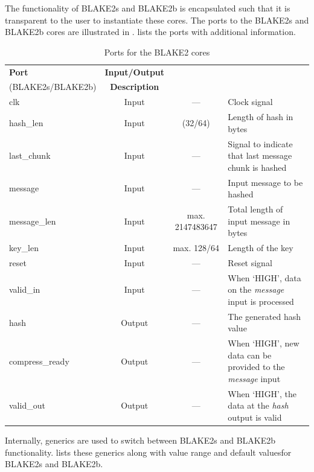 \documentclass[%
	a4paper,
]
{article}
\begin{document}
The functionality of BLAKE2s and BLAKE2b is encapsulated such that it is
transparent to the user to instantiate these cores. The ports to the
BLAKE2s and BLAKE2b cores are illustrated in .
 lists the ports with additional information.

\begin{table}[htp]

	\centering
	\caption{Ports for the BLAKE2 cores}	
	\label{tbl:blake2-ports}
	\renewcommand{\arraystretch}{2}
	\begin{tabular}{l|c|c|m{3cm}}


	\hline
	\textbf{Port}
	& \textbf{Input/Output}
	&	\begin{minipage}[c]{3cm}%
				\textbf{Default value} \\
				(BLAKE2s/BLAKE2b)%
			\end{minipage}%
	& \textbf{Description}
	\\\hline

	clk
	& Input
	& ---
	& Clock signal
	\\\hline

	hash_len
	& Input
	& (32/64)
	&	Length of hash in bytes
	\\\hline

	last_chunk
	& Input
	& ---
	&	Signal to indicate that last message chunk is hashed%
	\\\hline

	message
	& Input
	& ---
	&	Input message to be hashed
	\\\hline

	message_len
	& Input
	& max. 2147483647
	& Total length of input message in bytes
	\\\hline

	key_len
	& Input
	& max. 128/64
	& Length of the key
	\\\hline

	reset
	& Input
	& ---
	& Reset signal
	\\\hline

	valid_in
	& Input
	& ---
	&	When `HIGH', data on the \emph{message} input is processed
	\\\hline

	hash
	& Output
	& ---
	&	The generated hash value
	\\\hline

	compress_ready
	& Output
	& ---
	&	When `HIGH', new data can be provided to the \emph{message} input
	\\\hline

	valid_out
	& Output
	& ---
	&	When `HIGH', the data at the \emph{hash} output is valid
	\\\hline

	\end{tabular}

\end{table}
%
%
Internally, generics are used to switch between BLAKE2s and BLAKE2b
functionality.  lists these generics along with
value range and default valuesfor BLAKE2s and BLAKE2b.
\end{document}
